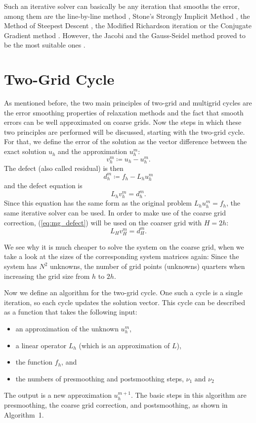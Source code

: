 Such an iterative solver can basically be any iteration that smooths the error, among them are the line-by-line method \cite{mazumder2015numerical},  Stone's Strongly Implicit Method \cite{stone1968iterative}, the Method of Steepest Descent \cite{mazumder2015numerical}, the Modified Richardson iteration \cite{richardson1911ix} or the Conjugate Gradient method \cite{hestenes1952methods}. However, the Jacobi and the Gauss-Seidel method proved to be the most suitable ones \cite{Trottenberg:2000:MUL:374106}.



\section{Two-Grid Cycle}
As mentioned before, the two main principles of two-grid and multigrid cycles are the error smoothing properties of relaxation methods and the fact that smooth errors can be well approximated on coarse grids. Now the steps in which these two principles are performed will be discussed, starting with the two-grid cycle. For that, we define the error of the solution as the vector difference between the exact solution $u_h$ and the approximation $u_h^m$:
\begin{equation}
v_h^m \coloneqq u_h - u_h^m.
\end{equation}
The defect (also called residual) is then
\begin{equation}
d_h^m \coloneqq f_h - L_h u_h^m
\end{equation}
and the defect equation is 
\begin{equation}
L_h v_h^m = d_h^m.
\label{eq:mg_defect}
\end{equation}
Since this equation has the same form as the original problem $L_hu_h^m = f_h$, the same iterative solver can be used. In order to make use of the coarse grid correction, (\ref{eq:mg_defect}) will be used on the coarser grid with $H = 2h$:
\begin{equation}
L_H v_H^m = d_H^m.
\end{equation}

We see why it is much cheaper to solve the system on the coarse grid, when we take a look at the sizes of the corresponding system matrices again: Since the system has $N^2$ unknowns, the number of grid points (unknowns) quarters when increasing the grid size from $h$ to $2h$.

Now we define an algorithm for the two-grid cycle. One such a cycle is a single iteration, so each cycle updates the solution vector. This cycle can be described as a function that takes the following input: 
\begin{itemize}
\item an approximation of the unknown $u_h^{m}$,
\item a linear operator $L_h$ (which is an approximation of $L$),
\item the function $f_h$, and
\item the numbers of presmoothing and postsmoothing steps, \(\nu_1 \textrm{ and }  \nu_2\) 
\end{itemize}
The output is a new approximation $u_h^{m+1}$. The basic steps in this algorithm are presmoothing, the coarse grid correction, and postsmoothing, as shown in Algorithm~1.

